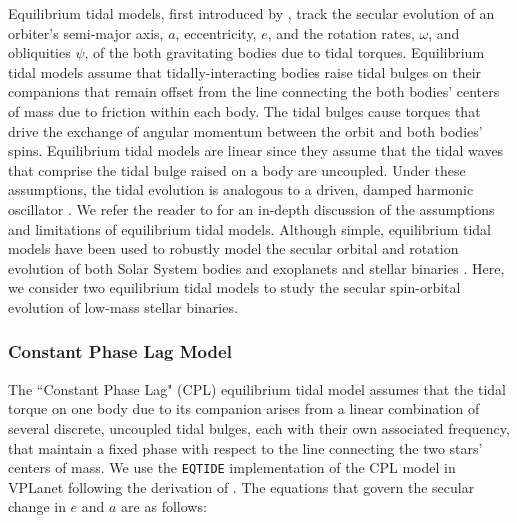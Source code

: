 \documentclass[twocolumn]{aastex61}
\newcommand{\eqtide}[0]{\texttt{EQTIDE}\xspace}
\begin{document}
 Equilibrium tidal models, first introduced by \citep{Darwin1880}, track the secular evolution of an orbiter's semi-major axis, $a$, eccentricity, $e$, and the rotation rates, $\omega$, and obliquities $\psi$, of the both gravitating bodies due to tidal torques. Equilibrium tidal models assume that tidally-interacting bodies raise tidal bulges on their companions that remain offset from the line connecting the both bodies' centers of mass due to friction within each body.  The tidal bulges cause torques that drive the exchange of angular momentum between the orbit and both bodies' spins. Equilibrium tidal models are linear since they assume that the tidal waves that comprise the tidal bulge raised on a body are uncoupled. Under these assumptions, the tidal evolution is analogous to a driven, damped harmonic oscillator \citep{Greenberg2009}.  We refer the reader to \citet{Barnes2017} for an in-depth discussion of the assumptions and limitations of equilibrium tidal models.  Although simple, equilibrium tidal models have been used to robustly model the secular orbital and rotation evolution of both Solar System bodies and exoplanets \citet[e.g.][]{Goldreich1966,Jackson2009,Leconte2010,Heller2011,Barnes2013,Barnes2017} and stellar binaries \citep[e.g.][]{Zahn1989,Zahn2008,Khaliullin2011,Repetto2014,Fleming2018}.  Here, we consider two equilibrium tidal models to study the secular spin-orbital evolution of low-mass stellar binaries.  

\subsubsection{Constant Phase Lag Model}

The ``Constant Phase Lag" (CPL) \citep[][]{FerrazMello2008,Heller2011} equilibrium tidal model assumes that the tidal torque on one body due to its companion arises from a linear combination of several discrete, uncoupled tidal bulges, each with their own associated frequency, that maintain a fixed phase with respect to the line connecting the two stars' centers of mass. We use the \eqtide implementation of the CPL model in VPLanet following the derivation of \citet{FerrazMello2008}.  The equations that govern the secular change in $e$ and $a$ are as follows:
\end{document}
